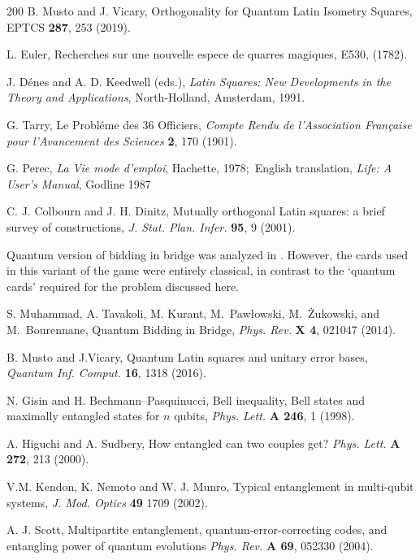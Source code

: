 \documentclass[english,aps,pra,nofootinbib,twocolumn,superscriptaddress]{revtex4-1}
\newcommand{\1}{{\rm 1\hspace{-0.9mm}l}}
\begin{document}
\begin{thebibliography}{200}
 B. Musto and  J. Vicary,
                  Orthogonality for Quantum Latin Isometry Squares,
                  EPTCS {\bf 287}, 253 (2019).

 L. Euler,
   Recherches sur une nouvelle espece de quarres magiques, 
   E530,  (1782).

 J. D{\'e}nes and A. D. Keedwell (eds.), 
{\sl Latin Squares: New
Developments in the Theory and Applications}, 
North-Holland, Amsterdam, 1991.
   
   G. Tarry,  Le Probl{\'e}me des 36 Officiers,
  {\sl   Compte Rendu de l'Association Fran{\c c}aise pour l'Avancement des Sciences}
  {\bf 2}, 170 (1901).
  
     G. Perec, {\sl La Vie mode d'emploi}, 
     Hachette, 1978;\  English translation,
     {\sl Life: A User's Manual},  Godline 1987 

  C. J. Colbourn and J. H.  Dinitz, 
   Mutually orthogonal Latin squares: a brief survey of constructions,
   {\sl J. Stat. Plan. Infer.} {\bf  95}, 9 (2001). 

 Quantum version of bidding in bridge 
	 was analyzed in \cite{MTK14+}.
	  However, the cards used in this variant of the game
	   were entirely classical, in contrast to the `quantum cards' 
	    required for the problem discussed here.

 S. Muhammad, A. Tavakoli, M. Kurant, M.~Paw{\l}owski, 
M.~{\.Z}ukowski, and M.~Bourennane,
 Quantum Bidding in Bridge,
{\sl Phys. Rev.} {\bf  X 4}, 021047 (2014).

 B. Musto and J.Vicary, 
Quantum Latin squares and unitary error bases,
{\sl Quantum Inf. Comput.} {\bf 16}, 1318 (2016).

 N. Gisin and H. Bechmann--Pasquinucci,
Bell inequality, Bell states and maximally entangled states for $n$ qubits,
{\sl Phys. Lett.} {\bf A  246}, 1 (1998).

  A. Higuchi and A. Sudbery,
How entangled can two couples get?
{\sl Phys. Lett.} {\bf A 272}, 213 (2000).

 V.M. Kendon, K. Nemoto and W. J. Munro,
Typical entanglement in multi-qubit systems,
{\sl J. Mod. Optics} {\bf  49} 1709 (2002).

 A. J. Scott,
Multipartite entanglement, quantum-error-correcting codes,
 and entangling power of quantum evolutions
{\sl Phys. Rev.} {\bf  A 69}, 052330 (2004).


\end{thebibliography}
\end{document}
